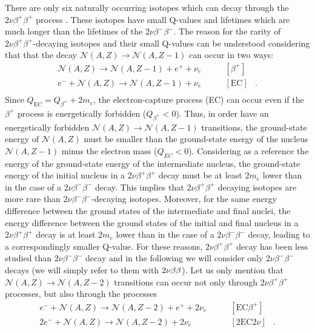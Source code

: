 There are only six naturally occurring isotopes which can decay through the $2\nu\beta^+\beta^+$ process \cite{Haxton:1985am}. These isotopes have small Q-values and lifetimes which are much longer than the lifetimes of the $2\nu\beta^-\beta^-$. The reason for the rarity of $2\nu\beta^+\beta^+$-decaying isotopes and their small Q-values can be understood considering that that the decay $\mathcal{N}(A,Z)\rightarrow\mathcal{N}(A,Z-1)$ can occur in two ways:
\[
	\begin{array}{lrl}
		\mathcal{N}(A,Z)\rightarrow\mathcal{N}(A,Z-1)+e^++\nu_e & \qquad [\beta^+] & \\
		e^-+\mathcal{N}(A,Z)\rightarrow\mathcal{N}(A,Z-1)+\nu_e & \qquad [\text{EC}]&. \\
	\end{array}
\]
Since $Q_\text{EC} = Q_{\beta^+}+2m_e$, the electron-capture process (EC) can occur even if the $\beta^+$ process is energetically forbidden ($Q_{\beta^+}<0$). Thus, in order have an energetically forbidden $\mathcal{N}(A,Z)\rightarrow\mathcal{N}(A,Z-1)$ transitions, the ground-state energy of $\mathcal{N}(A,Z)$ must be smaller than the ground-state energy of the nucleus $\mathcal{N}(A,Z-1)$ minus the electron mass ($Q_{EC}<0$). Considering as a reference the energy of the ground-state energy of the intermediate nucleus, the ground-state energy of the initial nucleus in a $2\nu\beta^+\beta^+$ decay must be at least $2m_e$ lower than in the case of a $2\nu\beta^-\beta^-$ decay. This implies that $2\nu\beta^+\beta^+$ decaying isotopes are more rare than $2\nu\beta^-\beta^-$-decaying isotopes. Moreover, for the same energy difference between the ground states of the intermediate and final nuclei, the energy difference between the ground states of the initial and final nucleus in a $2\nu\beta^+\beta^+$ decay is at least $2m_e$ lower than in the case of a $2\nu\beta^-\beta^-$ decay, leading to a correspondingly smaller Q-value. For these reasons, $2\nu\beta^+\beta^+$ decay has been less studied than $2\nu\beta^-\beta^-$ decay and in the following we will consider only $2\nu\beta^-\beta^-$ decays (we will simply refer to them with $2\nu\beta\beta$). Let us only mention that $\mathcal{N}(A,Z)\rightarrow\mathcal{N}(A,Z-2)$ transitions can occur not only through $2\nu\beta^+\beta^+$ processes, but also through the processes 
\[
	\begin{array}{lrl}
		e^-+\mathcal{N}(A,Z)\rightarrow\mathcal{N}(A,Z-2)+e^++2\nu_e & \qquad [\text{EC}\beta^+] & \\
		2e^-+\mathcal{N}(A,Z)\rightarrow\mathcal{N}(A,Z-2)+2\nu_e & \qquad [2\text{EC}2\nu] & . \\
	\end{array}
\]

